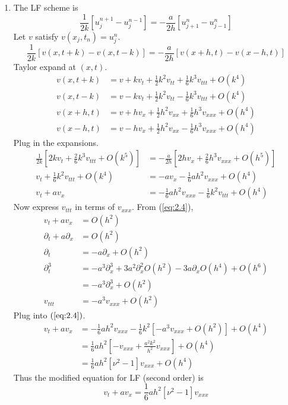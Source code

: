\documentclass{article}
\newcommand{\sbr}[1]{\left[#1\right]}
\newcommand{\ptl}{\partial}
\begin{document}
\begin{enumerate}
\begin{enumerate}
\begin{enumerate}
		
		\item The LF scheme is
		$$\frac{1}{2k}[u_j^{n+1} - u_j^{n-1}] = -\frac{a}{2h}[u_{j+1}^n - u_{j-1}^n]$$
		Let $v$ satisfy $v(x_j,t_n)=u_j^n$.
		$$\frac{1}{2k}[v(x,t+k) - v(x,t-k)] = -\frac{a}{2h}[v(x+h,t) - v(x-h,t)]$$
		Taylor expand at $(x,t)$.
		\begin{align*}
			v(x,t+k) &= v + kv_t + \frac12k^2v_{tt} + \frac16k^3v_{ttt} + O(k^4)\\
			v(x,t-k) &= v - kv_t + \frac12k^2v_{tt} - \frac16k^3v_{ttt} + O(k^4)\\
			v(x+h,t) &= v + hv_x + \frac12h^2v_{xx} + \frac16h^3v_{xxx} + O(h^4)\\
			v(x-h,t) &= v - hv_x + \frac12h^2v_{xx} - \frac16h^3v_{xxx} + O(h^4)
		\end{align*}
		Plug in the expansions.
		\begin{align}
			\frac{1}{2k}\sbr{2kv_t + \frac26k^3v_{ttt} + O(k^5)} &= -\frac{a}{2h}\sbr{2hv_x + \frac26h^3v_{xxx} + O(h^5)} \nonumber\\
			v_t + \frac16k^2v_{ttt} + O(k^4) &= -av_x - \frac16ah^2v_{xxx} + O(h^4) \nonumber\\
			v_t + av_x &= -\frac16ah^2v_{xxx} - \frac16k^2v_{ttt} + O(h^4) \label{eq:2.4}
		\end{align}
		Now express $v_{ttt}$ in terms of $v_{xxx}$. From (\ref{eq:2.4}),
		\begin{align*}
			v_t + av_x &= O(h^2)\\
			\ptl_t+ a\ptl_x &= O(h^2)\\
			\ptl_t &= -a\ptl_x + O(h^2)\\
			\ptl_t^3 &= -a^3\ptl_x^3 + 3a^2\ptl_x^2O(h^2) - 3a\ptl_xO(h^4) + O(h^6)\\
			&= -a^3\ptl_x^3 + O(h^2)\\
			v_{ttt} &= -a^3v_{xxx} + O(h^2)
		\end{align*}
		Plug into $(\ref{eq:2.4})$.
		\begin{align*}
			v_t + av_x &= -\frac16ah^2v_{xxx} - \frac16k^2[-a^3v_{xxx} + O(h^2)] + O(h^4)\\
			&= \frac16ah^2\sbr{-v_{xxx} + \frac{a^2k^2}{h^2}v_{xxx}} + O(h^4)\\
			&= \frac16ah^2[\nu^2-1]v_{xxx} + O(h^4)
		\end{align*}
		Thus the modified equation for LF (second order) is
		$$\boxed{v_t + av_x = \frac16ah^2[\nu^2-1]v_{xxx}}$$
		

\end{enumerate}
\end{enumerate}
\end{enumerate}
\end{document}
